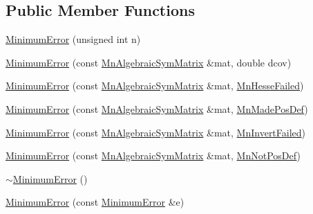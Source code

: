 \subsection*{Public Member Functions}
\begin{DoxyCompactItemize}
\item 
\mbox{\hyperlink{classROOT_1_1Minuit2_1_1MinimumError_a4438a39dcecf1990ed8449d1bad58116}{Minimum\+Error}} (unsigned int n)
\item 
\mbox{\hyperlink{classROOT_1_1Minuit2_1_1MinimumError_ac124d3ba147dbb6ed30ec4ca75afe5b4}{Minimum\+Error}} (const \mbox{\hyperlink{namespaceROOT_1_1Minuit2_a9e74ad97f5537a2e80e52b04d98ecc6e}{Mn\+Algebraic\+Sym\+Matrix}} \&mat, double dcov)
\item 
\mbox{\hyperlink{classROOT_1_1Minuit2_1_1MinimumError_a8b5e1aee505048147c296087ae9b2adb}{Minimum\+Error}} (const \mbox{\hyperlink{namespaceROOT_1_1Minuit2_a9e74ad97f5537a2e80e52b04d98ecc6e}{Mn\+Algebraic\+Sym\+Matrix}} \&mat, \mbox{\hyperlink{classROOT_1_1Minuit2_1_1MinimumError_1_1MnHesseFailed}{Mn\+Hesse\+Failed}})
\item 
\mbox{\hyperlink{classROOT_1_1Minuit2_1_1MinimumError_a40d062270456e450e1895179d99ee754}{Minimum\+Error}} (const \mbox{\hyperlink{namespaceROOT_1_1Minuit2_a9e74ad97f5537a2e80e52b04d98ecc6e}{Mn\+Algebraic\+Sym\+Matrix}} \&mat, \mbox{\hyperlink{classROOT_1_1Minuit2_1_1MinimumError_1_1MnMadePosDef}{Mn\+Made\+Pos\+Def}})
\item 
\mbox{\hyperlink{classROOT_1_1Minuit2_1_1MinimumError_a91e6b02e914170669e0d10f9e8c38735}{Minimum\+Error}} (const \mbox{\hyperlink{namespaceROOT_1_1Minuit2_a9e74ad97f5537a2e80e52b04d98ecc6e}{Mn\+Algebraic\+Sym\+Matrix}} \&mat, \mbox{\hyperlink{classROOT_1_1Minuit2_1_1MinimumError_1_1MnInvertFailed}{Mn\+Invert\+Failed}})
\item 
\mbox{\hyperlink{classROOT_1_1Minuit2_1_1MinimumError_afb993aad7059efe22f48f2496e3664a9}{Minimum\+Error}} (const \mbox{\hyperlink{namespaceROOT_1_1Minuit2_a9e74ad97f5537a2e80e52b04d98ecc6e}{Mn\+Algebraic\+Sym\+Matrix}} \&mat, \mbox{\hyperlink{classROOT_1_1Minuit2_1_1MinimumError_1_1MnNotPosDef}{Mn\+Not\+Pos\+Def}})
\item 
\mbox{\hyperlink{classROOT_1_1Minuit2_1_1MinimumError_a24b67f819804d118f9e98a7a7a3e9968}{$\sim$\+Minimum\+Error}} ()
\item 
\mbox{\hyperlink{classROOT_1_1Minuit2_1_1MinimumError_a13cdd3740a255f9da59aa38a829bdc2d}{Minimum\+Error}} (const \mbox{\hyperlink{classROOT_1_1Minuit2_1_1MinimumError}{Minimum\+Error}} \&e)
\item 

\end{DoxyCompactItemize}
